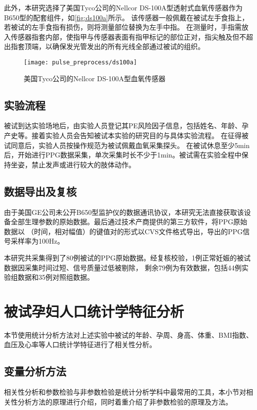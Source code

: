 此外，本研究选择了美国Tyco公司的Nellcor DS-100A型透射式血氧传感器作为B650型的配套组件，如\autoref{fig:ds100a}所示。
该传感器一般佩戴在被试左手食指上，若被试的左手食指有损伤，则将测量部位替换为左手中指。
在测量时，手指需放入传感器指套内部，使指甲与传感器表面有指甲标记的部位正对，指尖触及但不超出指套顶端，以确保发光管发出的所有光线全部通过被试的组织。

\begin{figure}[htbp]
    \centering
    \texttt{[image: pulse\_preprocess/ds100a]}
    \caption{\label{fig:ds100a}美国Tyco公司的Nellcor DS-100A型血氧传感器}
\end{figure}

\subsection{实验流程}
被试到达实验场地后，由实验人员登记其PE风险因子信息，包括姓名、年龄、孕产史等。接着实验人员会告知被试本实验的研究目的与具体实验流程。
在征得被试同意后，实验人员按操作规范为被试佩戴血氧采集探头\cite{Chen2021}。
在被试休息至少5min后，开始进行PPG数据采集，单次采集时长不少于1min。被试需在实验全程中保持坐姿，禁止发声或进行较大的肢体动作。

\subsection{数据导出及复核}
由于美国GE公司未公开B650型监护仪的数据通讯协议，本研究无法直接获取该设备全部生理参数的原始数据。最后通过技术产商提供的第三方软件，将PPG原始数据以
（时间，相对幅值）的键值对的形式以CVS文件格式导出，导出的PPG信号采样率为100Hz。

本研究共采集得到了80例被试的PPG原始数据。经复核校验，1例正常妊娠的被试数据因采集时间过短、信号质量过低被剔除，
剩余79例为有效数据，包括44例实验组数据和35例对照组数据。

\section{被试孕妇人口统计学特征分析}
本节使用统计分析方法对上述实验中被试的年龄、孕周、身高、体重、BMI指数、血压及心率等人口统计学特征进行了相关性分析。

\subsection{变量分析方法}
相关性分析和参数检验与非参数检验是统计分析学科中最常用的工具，本小节对相关性分析方法的原理进行介绍，同时着重介绍了非参数检验的原理及方法。

